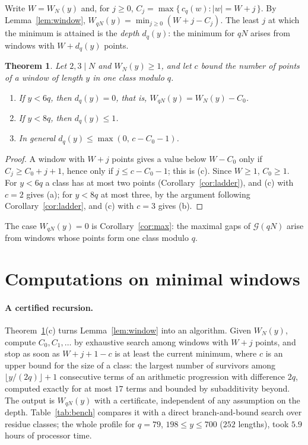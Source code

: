\documentclass[11pt]{article}
\newtheorem{theorem}{Theorem}[section]
\theoremstyle{definition}
\theoremstyle{remark}
\newcommand{\G}{\mathcal{G}}
\begin{document}
Write $W = W_N(y)$ and, for $j \ge 0$, $C_j = \max\{\, c_q(w) : |w| = W + j \,\}$. By Lemma~\ref{lem:window}, $W_{qN}(y) = \min_{j \ge 0} (W + j - C_j)$. The least $j$ at which the minimum is attained is the \emph{depth} $d_q(y)$: the minimum for $qN$ arises from windows with $W + d_q(y)$ points.

\begin{theorem}\label{thm:depth}
Let $2, 3 \mid N$ and $W_N(y) \ge 1$, and let $c$ bound the number of points of a window of length $y$ in one class modulo $q$.
\begin{enumerate}
\item[(a)] If $y < 6q$, then $d_q(y) = 0$, that is, $W_{qN}(y) = W_N(y) - C_0$.
\item[(b)] If $y < 8q$, then $d_q(y) \le 1$.
\item[(c)] In general $d_q(y) \le \max(0,\, c - C_0 - 1)$.
\end{enumerate}
\end{theorem}

\begin{proof}
A window with $W + j$ points gives a value below $W - C_0$ only if $C_j \ge C_0 + j + 1$, hence only if $j \le c - C_0 - 1$; this is (c). Since $W \ge 1$, $C_0 \ge 1$. For $y < 6q$ a class has at most two points (Corollary~\ref{cor:ladder}), and (c) with $c = 2$ gives (a); for $y < 8q$ at most three, by the argument following Corollary~\ref{cor:ladder}, and (c) with $c = 3$ gives (b).
\end{proof}

The case $W_{qN}(y) = 0$ is Corollary~\ref{cor:max}: the maximal gaps of $\G(qN)$ arise from windows whose points form one class modulo $q$.

\section{Computations on minimal windows}\label{sec:compdepth}

\paragraph{A certified recursion.} Theorem~\ref{thm:depth}(c) turns Lemma~\ref{lem:window} into an algorithm. Given $W_N(y)$, compute $C_0, C_1, \dots$ by exhaustive search among windows with $W + j$ points, and stop as soon as $W + j + 1 - c$ is at least the current minimum, where $c$ is an upper bound for the size of a class: the largest number of survivors among $\lfloor y/(2q) \rfloor + 1$ consecutive terms of an arithmetic progression with difference $2q$, computed exactly for at most $17$ terms and bounded by subadditivity beyond. The output is $W_{qN}(y)$ with a certificate, independent of any assumption on the depth. Table~\ref{tab:bench} compares it with a direct branch-and-bound search over residue classes; the whole profile for $q = 79$, $198 \le y \le 700$ ($252$ lengths), took $5.9$ hours of processor time.
\end{document}
